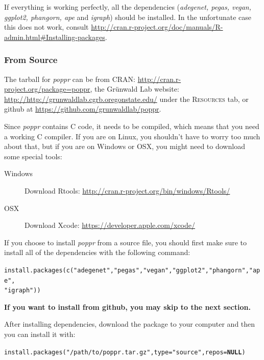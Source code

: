 \documentclass[letterpaper]{article}\usepackage[]{graphicx}\usepackage[]{color}
\makeatletter
\newcommand{\hlstr}[1]{\textcolor[rgb]{0.651,0.522,0}{#1}}%
\newcommand{\hlstd}[1]{\textcolor[rgb]{0,0,0}{#1}}%
\newcommand{\hlkwa}[1]{\textcolor[rgb]{0.733,0.475,0.467}{\textbf{#1}}}%
\newcommand{\hlkwc}[1]{\textcolor[rgb]{0,0.502,0.753}{#1}}%
\newcommand{\hlkwd}[1]{\textcolor[rgb]{0,0.267,0.4}{#1}}%
\newenvironment{kframe}{%
 \def\at@end@of@kframe{}%
 \ifinner\ifhmode%
  \def\at@end@of@kframe{\end{minipage}}%
  \begin{minipage}{\columnwidth}%
 \fi\fi%
 \def\FrameCommand##1{\hskip\@totalleftmargin \hskip-\fboxsep
 \colorbox{shadecolor}{##1}\hskip-\fboxsep
     \hskip-\linewidth \hskip-\@totalleftmargin \hskip\columnwidth}%
 \MakeFramed {\advance\hsize-\width
   \@totalleftmargin\z@ \linewidth\hsize
   \@setminipage}}%
 {\par\unskip\endMakeFramed%
 \at@end@of@kframe}
\newenvironment{knitrout}{}{} %
\newcommand{\tab}{\hspace*{1em}}
\newcommand{\poppr}{\textit{poppr}}
\makeatother
\begin{document}
If everything is working perfectly, all the dependencies (\textit{adegenet, pegas, vegan, ggplot2, phangorn, ape} and \textit{igraph}) should be installed. In the unfortunate case this does not work, consult \url{http://cran.r-project.org/doc/manuals/R-admin.html#Installing-packages}.

\subsubsection{From Source}
\tab\tab The tarball for \poppr{} can be from CRAN: \url{http://cran.r-project.org/package=poppr}, the Gr\"unwald Lab website: \url{http://http://grunwaldlab.cgrb.oregonstate.edu/} under the \textsc{Resources} tab, or github at \url{https://github.com/grunwaldlab/poppr}. 

Since \poppr{} contains C code, it needs to be compiled, which means that you need a working C compiler. If you are on Linux, you shouldn't have to worry too much about that, but if you are on Windows or OSX, you might need to download some special tools:

\begin{description}
  \item[Windows] Download Rtools: \url{http://cran.r-project.org/bin/windows/Rtools/}
  \item[OSX] Download Xcode: \url{https://developer.apple.com/xcode/}
\end{description}

If you choose to install \poppr{} from a source file, you should first make sure to install all of the dependencies with the following command:
\begin{knitrout}\footnotesize
{}\color{fgcolor}\begin{kframe}
\begin{alltt}
\hlkwd{install.packages}\hlstd{(}\hlkwd{c}\hlstd{(}\hlstr{"adegenet"}\hlstd{,} \hlstr{"pegas"}\hlstd{,} \hlstr{"vegan"}\hlstd{,} \hlstr{"ggplot2"}\hlstd{,} \hlstr{"phangorn"}\hlstd{,} \hlstr{"ape"}\hlstd{,}
    \hlstr{"igraph"}\hlstd{))}
\end{alltt}
\end{kframe}
\end{knitrout}

\textbf{If you want to install from github, you may skip to the next section.}

After installing dependencies, download the package to your computer and then you can install it with:
\begin{knitrout}\footnotesize
{}\color{fgcolor}\begin{kframe}
\begin{alltt}
\hlkwd{install.packages}\hlstd{(}\hlstr{"/path/to/poppr.tar.gz"}\hlstd{,} \hlkwc{type} \hlstd{=} \hlstr{"source"}\hlstd{,} \hlkwc{repos} \hlstd{=} \hlkwa{NULL}\hlstd{)}
\end{alltt}
\end{kframe}
\end{knitrout}
\end{document}
